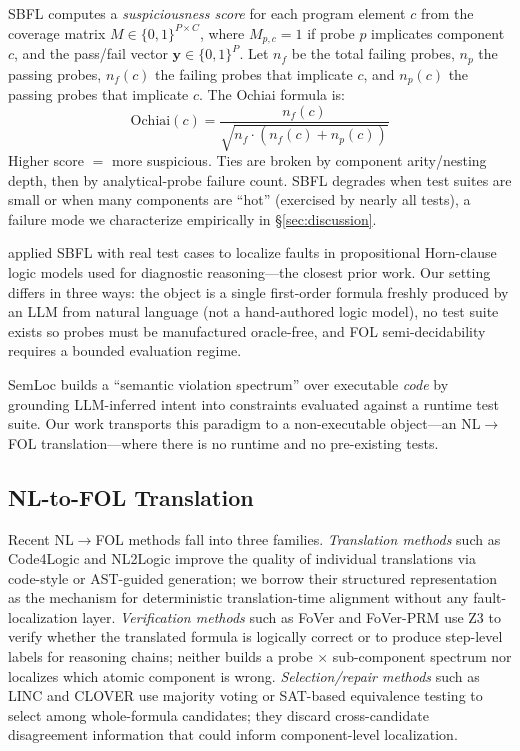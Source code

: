 \documentclass[11pt,letterpaper]{article}
\begin{document}
SBFL \citep{Jones2005,Abreu2007,Wong2014} computes a \emph{suspiciousness score} for each program element $c$ from the coverage matrix $M \in \{0,1\}^{P \times C}$, where $M_{p,c}=1$ if probe $p$ implicates component $c$, and the pass/fail vector $\mathbf{y} \in \{0,1\}^P$. Let $n_f$ be the total failing probes, $n_p$ the passing probes, $n_f(c)$ the failing probes that implicate $c$, and $n_p(c)$ the passing probes that implicate $c$. The Ochiai formula is:
\begin{equation}
  \text{Ochiai}(c) = \frac{n_f(c)}{\sqrt{n_f \cdot (n_f(c) + n_p(c))}}
\end{equation}
Higher score $=$ more suspicious. Ties are broken by component arity/nesting depth, then by analytical-probe failure count. SBFL degrades when test suites are small or when many components are ``hot'' (exercised by nearly all tests), a failure mode we characterize empirically in \S\ref{sec:discussion}.

\citet{Pill2018} applied SBFL with real test cases to localize faults in propositional Horn-clause logic models used for diagnostic reasoning—the closest prior work. Our setting differs in three ways: the object is a single first-order formula freshly produced by an LLM from natural language (not a hand-authored logic model), no test suite exists so probes must be manufactured oracle-free, and FOL semi-decidability requires a bounded evaluation regime.

SemLoc \citep{SemLoc2026} builds a ``semantic violation spectrum'' over executable \emph{code} by grounding LLM-inferred intent into constraints evaluated against a runtime test suite. Our work transports this paradigm to a non-executable object—an NL$\to$FOL translation—where there is no runtime and no pre-existing tests.

\subsection{NL-to-FOL Translation}

Recent NL$\to$FOL methods fall into three families. \emph{Translation methods} such as Code4Logic \citep{Liu2025} and NL2Logic \citep{NL2Logic2026} improve the quality of individual translations via code-style or AST-guided generation; we borrow their structured representation as the mechanism for deterministic translation-time alignment without any fault-localization layer. \emph{Verification methods} such as FoVer \citep{Pei2025} and FoVer-PRM \citep{Zhu2025} use Z3 to verify whether the translated formula is logically correct or to produce step-level labels for reasoning chains; neither builds a probe $\times$ sub-component spectrum nor localizes which atomic component is wrong. \emph{Selection/repair methods} such as LINC \citep{Olausson2023} and CLOVER \citep{Ryu2025} use majority voting or SAT-based equivalence testing to select among whole-formula candidates; they discard cross-candidate disagreement information that could inform component-level localization.
\end{document}
